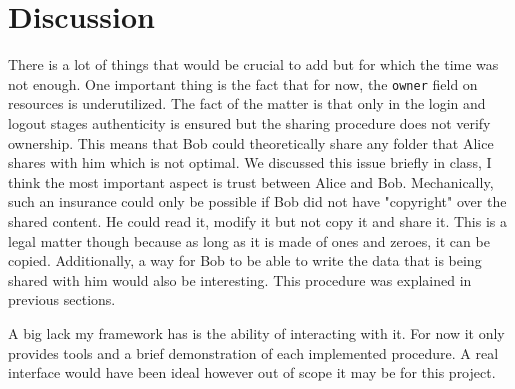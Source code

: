 \section{Discussion}
There is a lot of things that would be crucial to add but for which the time was not enough. One important thing is the fact that for now, the \lstinline{owner} field on resources is underutilized. The fact of the matter is that only in the login and logout stages authenticity is ensured but the sharing procedure does not verify ownership. This means that Bob could theoretically share any folder that Alice shares with him which is not optimal. We discussed this issue briefly in class, I think the most important aspect is trust between Alice and Bob. Mechanically, such an insurance could only be possible if Bob did not have "copyright" over the shared content. He could read it, modify it but not copy it and share it. This is a legal matter though because as long as it is made of ones and zeroes, it can be copied. Additionally, a way for Bob to be able to write the data that is being shared with him would also be interesting. This procedure was explained in previous sections. 

A big lack my framework has is the ability of interacting with it. For now it only provides tools and a brief demonstration of each implemented procedure. A real interface would have been ideal however out of scope it may be for this project.